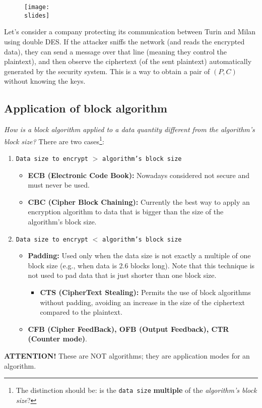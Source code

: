 \begin{figure}[h]
    \centering
    \texttt{[image: \\slides]}
\end{figure}

Let's consider a company protecting its communication between Turin and Milan using double DES. If the attacker sniffs the network (and reads the encrypted data), they can send a message over that line (meaning they control the plaintext), and then observe the ciphertext (of the sent plaintext) automatically generated by the security system.
This is a way to obtain a pair of \((P, C)\) without knowing the keys.




\newpage
\subsection{Application of block algorithm}

\textit{How is a block algorithm applied to a data quantity different from the algorithm's block size?}
There are two cases\footnote{The distinction should be: is the \texttt{data size} \textbf{multiple} of the \textit{algorithm's block size}?}:
\begin{enumerate}
    \item \texttt{Data size to encrypt} $>$ \texttt{algorithm's block size}
          \begin{itemize}
              \item \textbf{ECB (Electronic Code Book):} Nowadays considered not secure and must never be used.
              \item \textbf{CBC (Cipher Block Chaining):} Currently the best way to apply an encryption algorithm to data that is bigger than the size of the algorithm's block size.
          \end{itemize}

    \item \texttt{Data size to encrypt} $<$ \texttt{algorithm's block size}
          \begin{itemize}
              \item \textbf{Padding:} Used only when the data size is not exactly a multiple of one block size (e.g., when data is 2.6 blocks long). Note that this technique is not used to pad data that is just shorter than one block size.
                    \begin{itemize}
                        \item \textbf{CTS (CipherText Stealing):} Permits the use of block algorithms without padding, avoiding an increase in the size of the ciphertext compared to the plaintext.
                    \end{itemize}
              \item \textbf{CFB (Cipher FeedBack), OFB (Output Feedback), CTR (Counter mode)}.
          \end{itemize}
\end{enumerate}
\textbf{ATTENTION!} These are NOT algorithms; they are application modes for an algorithm.

